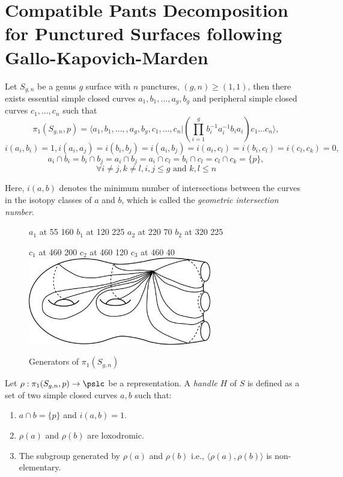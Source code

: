 
\chapter{Compatible Pants Decomposition for Punctured Surfaces following Gallo-Kapovich-Marden}

Let $S_{g,n}$ be a genus $g$ surface with $n$ punctures, $(g,n) \geq (1,1)$, then there exists essential simple closed curves $a_1, b_1, \ldots, a_g, b_g$ and peripheral simple closed curves $c_1, \ldots, c_n$ such that 
\[\pi_1(S_{g,n},p) = \Bigg \langle a_1, b_1, \ldots,,a_g, b_g, c_1, \ldots, c_n \Bigg \vert \left(\prod_{i=1}^{g}b_i^{-1}a_i^{-1}b_i a_i \right) c_1 \ldots c_n \Bigg \rangle,\]
\[i(a_i,b_i) = 1, i(a_i,a_j) = i(b_i,b_j)=i(a_i,b_j)= i(a_i,c_l) = i(b_i,c_l) = i(c_l,c_k)= 0, \] 
\[a_i \cap b_i = b_i \cap b_j = a_i \cap b_j = a_i \cap c_l = b_i \cap c_l = c_l \cap c_k = \{p\}, \]
\[\forall i \neq j, k \neq l, i,j \leq g \text{ and } k,l\leq n\]

Here, $i(a, b)$ denotes the minimum number of intersections between the curves in the isotopy classes of $a$ and $b$, which is called the \textit{geometric intersection number}.

    \begin{figure}[h]
	
	\pinlabel $a_1$ at 55 160 
	\pinlabel $b_1$ at 120 225 
	\pinlabel $a_2$ at 220 70
	\pinlabel $b_2$ at 320 225
	
	\pinlabel $c_1$ at 460 200 
	\pinlabel $c_2$ at 460 120
	\pinlabel $c_3$ at 460 40 
     \endlabellist
     \centering
	\includegraphics[width=8cm]{Chapter2/Figs/fund_group}
	\caption{Generators of $\pi_1(S_{g,n})$}
	\label{fig:Gen}
    \end{figure}    


\begin{defn}\label{defn:handle}
	Let $\rho: \pi_1(S_{g,n},p) \rightarrow \pslc$ be a representation. A \textit{handle} $H$ of $S$ is defined as a set of two simple closed curves $a, b$ such that:
	\begin{enumerate}
		\item $a \cap b = \{p\}$ and $i(a,b) = 1$.
		\item $\rho(a)$ and $\rho(b)$ are loxodromic.
		\item The subgroup generated by $\rho(a)$ and $\rho(b)$ i.e., $\langle \rho(a), \rho(b) \rangle$ is non-elementary.
	\end{enumerate}
\end{defn}


